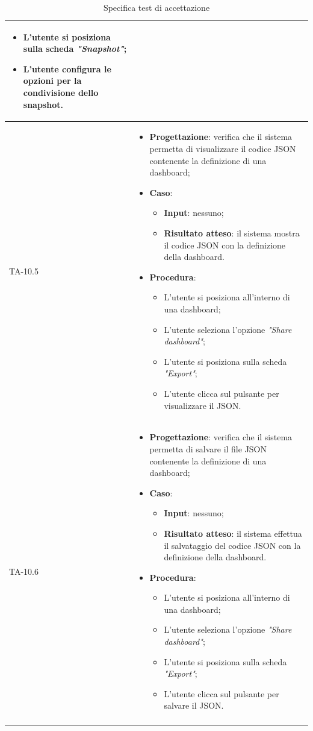 \begin{longtable}{|C{2.5cm}|C{13cm}|}
\begin{itemize}
\begin{itemize}
		\item L'utente si posiziona sulla scheda \emph{"Snapshot"};
		\item L'utente configura le opzioni per la condivisione dello snapshot.
	\end{itemize} 
\end{itemize}\\
\hline
{TA-10.5} &
\begin{itemize}
	\item \textbf{Progettazione}: verifica che il sistema permetta di visualizzare il codice JSON contenente la definizione
	di una dashboard;
	\item \textbf{Caso}: 
	\begin{itemize}
		\item \textbf{Input}: nessuno;
		\item \textbf{Risultato atteso}: il sistema mostra il codice JSON con la definizione della dashboard.
	\end{itemize}
	\item \textbf{Procedura}:
	\begin{itemize}
		\item L'utente si posiziona all'interno di una dashboard;
		\item L'utente seleziona l'opzione \emph{"Share dashboard"};
		\item L'utente si posiziona sulla scheda \emph{"Export"};
		\item L'utente clicca sul pulsante per visualizzare il JSON.
	\end{itemize} 
\end{itemize}\\
\hline
{TA-10.6} &
\begin{itemize}
	\item \textbf{Progettazione}: verifica che il sistema permetta di salvare il file JSON contenente la definizione di una
	dashboard;
	\item \textbf{Caso}: 
	\begin{itemize}
		\item \textbf{Input}: nessuno;
		\item \textbf{Risultato atteso}: il sistema effettua il salvataggio del codice JSON con la definizione della dashboard.
	\end{itemize}
	\item \textbf{Procedura}:
	\begin{itemize}
		\item L'utente si posiziona all'interno di una dashboard;
		\item L'utente seleziona l'opzione \emph{"Share dashboard"};
		\item L'utente si posiziona sulla scheda \emph{"Export"};
		\item L'utente clicca sul pulsante per salvare il JSON.
	\end{itemize} 
\end{itemize}\\
\hline
\caption{Specifica test di accettazione}
\end{longtable}
\renewcommand{\arraystretch}{1}
\newpage

